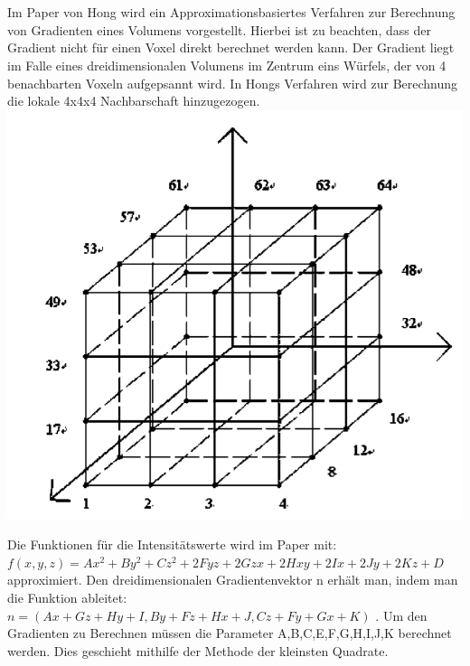 \chapter{}
\label{sec:state_of_the_art}




Im Paper von Hong \cite{hong2003method} wird ein Approximationsbasiertes Verfahren zur Berechnung von Gradienten eines Volumens vorgestellt. 
\newline
Hierbei ist zu beachten, dass der Gradient nicht für einen Voxel direkt berechnet werden kann. Der Gradient liegt im Falle eines dreidimensionalen Volumens im Zentrum eins Würfels, der von 4 benachbarten Voxeln aufgepsannt wird. In Hongs Verfahren wird zur Berechnung die lokale 4x4x4 Nachbarschaft hinzugezogen.
\newline
\includegraphics[width=\textwidth]{Logos/VoxelEdges.PNG}

Die Funktionen für die Intensitätswerte wird im Paper mit:  $f(x,y,z) = Ax^{2}+By^{2}+Cz^{2}+2Fyz+2Gzx+2Hxy+2Ix+2Jy+2Kz+D$  approximiert. Den dreidimensionalen Gradientenvektor n erhält man, indem man die Funktion ableitet: $n = (Ax+Gz+Hy+I, By+Fz+Hx+J, Cz + Fy + Gx + K)$ .
\newline
Um den Gradienten zu Berechnen müssen die Parameter A,B,C,E,F,G,H,I,J,K  berechnet werden. Dies geschieht mithilfe der Methode der kleinsten Quadrate.




